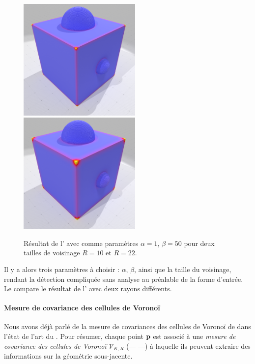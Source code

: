 \begin{figure}[hbt]
  \centering
  \includegraphics[height=6cm]{images/Feature/CubeSphere_Moments_r_10_c1}
  \includegraphics[height=6cm]{images/Feature/CubeSphere_Moments_r_22_c1}
  \caption[Résultat de l']{Résultat de l' avec comme paramètres $\alpha = 1$, $\beta = 50$ pour deux tailles de voisinage $R = 10$ et $R = 22$.}\label{fig:moment-C1}
\end{figure}

Il y a alors trois paramètres à choisir : $\alpha$, $\beta$, ainsi que la
taille du voisinage, rendant la détection compliquée sans analyse au préalable
de la forme d'entrée. Le  compare le résultat de l' avec deux rayons différents.
%
\paragraph{Mesure de covariance des cellules de Voronoï}
%
Nous avons déjà parlé de la mesure de covariances des cellules de Voronoï de
 dans l'état de l'art du
. Pour résumer, chaque point $\mathbf{p}$ est associé à une
\emph{mesure de covariance des cellules de Voronoï} $\mathcal{V}_{K,R}$ (\VCMM ---
\VCM ---) à laquelle ils peuvent extraire des informations sur la géométrie
sous-jacente.


